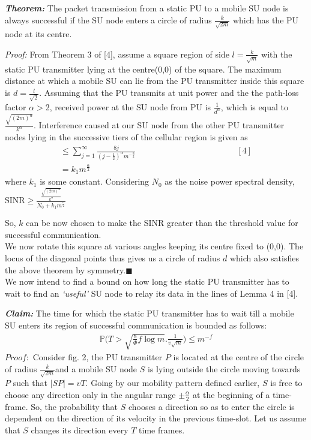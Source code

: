 \documentclass[conference]{IEEEtran}
\begin{document}
\emph{\bf Theorem:} The packet transmission from a static PU to a mobile SU node is always successful if the SU node enters a circle of radius $\frac{k}{\sqrt{2m}}$ which has the PU node 
at its centre.

\emph{Proof:} From Theorem 3 of [4], assume a square region of side $l=\frac{k}{\sqrt{m}}$ with the static PU transmitter lying at the centre(0,0) of the square. The maximum distance at which a 
mobile SU can lie from the PU transmitter inside this square is $d=\frac{l}{\sqrt{2}}$. Assuming that the PU transmits at unit power and the the path-loss factor $\alpha>$2, received power at the 
SU node from PU is $\frac{1}{d^\alpha}$, which is equal to $\frac{\sqrt{(2m)^\alpha}}{k^\alpha}$. Interference caused at our SU node from the other PU transmitter nodes lying in the successive 
tiers of the cellular region is given as
\begin{gather*}
\leq \sum_{j=1}^{\infty} \frac{8j}{(j-\frac{1}{2})^\alpha m^{-\frac{\alpha}{2}}} \quad \quad \quad \quad \quad \quad\quad\quad\quad\quad\quad\quad[4]\\
=k_1m^{\frac{\alpha}{2}}\quad \quad \quad \quad \quad \quad\quad\quad\quad\quad\quad \quad \quad \quad\quad \quad
\end{gather*}
\vspace{4mm}
where $k_1$ is some constant. Considering $N_0$ as the noise power spectral density, SINR$\geq\frac{\frac{\sqrt{(2m)^\alpha}}{k^\alpha}}{N_0+k_1m^{\frac{\alpha}{2}}}$


So, $k$ can be now chosen to make the SINR greater than the threshold value for successful communication.\\
We now rotate this square at various angles keeping its centre fixed to (0,0). The locus of the diagonal points thus gives us a circle of radius $d$ which also satisfies the above 
theorem by symmetry.\quad\quad\quad\quad\quad\quad\quad\quad\quad\quad\quad\quad\quad\quad\quad\quad\quad\quad\quad\quad$\blacksquare$\\
We now intend to find a bound on how long the static PU transmitter has to wait to find an \textit{`useful'} SU node to relay its data in the lines of Lemma 4 in [4].

\textit{\bf Claim:} The time for which the static PU transmitter has to wait till a mobile SU enters its region of successful communication is bounded as follows:\\
\begin{gather*}
\mathbb{P}\Big(T>\sqrt{\frac{8}{\Phi}f\log m}.\frac{1}{v\sqrt{m}}\Big)\leq m^{-f}
\end{gather*}
$Proof:$ Consider fig. 2, the PU transmitter $P$ is located at the centre of the circle of radius $\frac{k}{\sqrt{2m}}$and a mobile SU node $S$ is lying outside the circle moving towards
$P$ such that $|SP|=vT$. Going 
by our mobility pattern defined earlier, $S$ is free to choose any direction only in the angular range $\pm\frac{\alpha}{2}$ at the beginning of a time-frame. So, the probability 
that $S$ chooses a direction so as to enter the circle is dependent on the direction of its velocity in the previous time-slot. Let us assume that $S$ changes its direction every $T$
time frames. 
\end{document}
